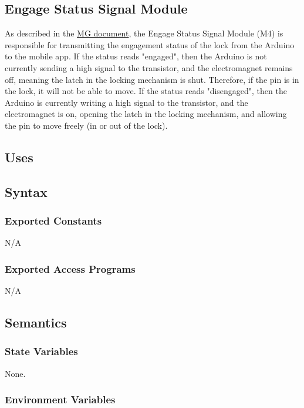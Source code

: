 \documentclass[12pt, titlepage]{article}
\begin{document}
\subsection{Engage Status Signal Module}

As described in the \href{https://github.com/NevoAbigail/Capstone/blob/main/docs/Design/SoftArchitecture/MG.pdf}{MG document}, the Engage Status Signal Module (M4) is responsible for transmitting the engagement status of the lock from the Arduino to the mobile app. If the status reads "engaged", then the Arduino is not currently sending a high signal to the transistor, and the electromagnet remains off, meaning the latch in the locking mechanism is shut. Therefore, if the pin is in the lock, it will not be able to move. If the status reads "disengaged", then the Arduino is currently writing a high signal to the transistor, and the electromagnet is on, opening the latch in the locking mechanism, and allowing the pin to move freely (in or out of the lock). 

\subsection{Uses}


\subsection{Syntax}

\subsubsection{Exported Constants}

N/A

\subsubsection{Exported Access Programs}

N/A

\subsection{Semantics}

\subsubsection{State Variables}

None. 

\subsubsection{Environment Variables}
\end{document}
